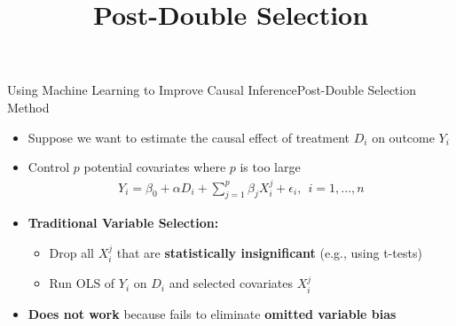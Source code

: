 \documentclass[hyperref={pdfpagelabels=false}]{beamer}
\begin{document}
\title[]  
{Post-Double Selection}


\author 
{}

\institute{}






\date
{}


\begin{frame}{}
	\titlepage
\end{frame}



	



\begin{frame}{Using Machine Learning to Improve Causal Inference}{Post-Double Selection Method}
    \begin{itemize}
        \item Suppose we want to estimate the causal effect of treatment $D_{i}$ on outcome $Y_{i}$
        \vspace{0.2cm}
        \item Control $p$ potential covariates where $p$ is too large
        \vspace{0.2cm}
        \begin{eqnarray*}
            Y_{i} = \beta_{0} + \alpha D_{i} + \sum^{p}_{j=1} \beta_{j} X^{j}_{i}  + \epsilon_{i}, \ \ i=1, \ldots ,n
        \end{eqnarray*}		
        
        \item \textbf{Traditional Variable Selection:}
        \begin{itemize}
            \vspace{0.2cm}
            \item[1] Drop all $X^{j}_{i}$ that are \textbf{statistically insignificant} (e.g., using t-tests)
            \vspace{0.2cm}
            \item[2] Run OLS of $Y_{i}$ on $D_{i}$ and selected covariates $X^{j}_{i}$
        \end{itemize}
                    \vspace{0.2cm}
        \item \textbf{Does not work} because fails to eliminate \textbf{omitted variable bias}
    \end{itemize}
\end{frame}
\end{document}
